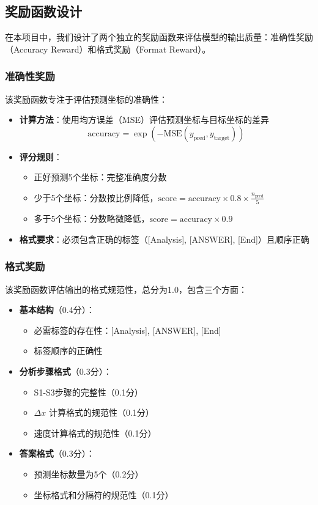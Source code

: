 \documentclass[a4paper, 12pt]{article}
\begin{document}
\subsection{奖励函数设计}
在本项目中，我们设计了两个独立的奖励函数来评估模型的输出质量：准确性奖励（Accuracy Reward）和格式奖励（Format Reward）。

\subsubsection{准确性奖励}
该奖励函数专注于评估预测坐标的准确性：
\begin{itemize}
    \item \textbf{计算方法}：使用均方误差（MSE）评估预测坐标与目标坐标的差异
        \begin{equation}
            \text{accuracy} = \exp(-\text{MSE}(y_{\text{pred}}, y_{\text{target}}))
        \end{equation}
    \item \textbf{评分规则}：
        \begin{itemize}
            \item 正好预测5个坐标：完整准确度分数
            \item 少于5个坐标：分数按比例降低，$\text{score} = \text{accuracy} \times 0.8 \times \frac{n_{\text{pred}}}{5}$
            \item 多于5个坐标：分数略微降低，$\text{score} = \text{accuracy} \times 0.9$
        \end{itemize}
    \item \textbf{格式要求}：必须包含正确的标签（[Analysis], [ANSWER], [End]）且顺序正确
\end{itemize}

\subsubsection{格式奖励}
该奖励函数评估输出的格式规范性，总分为1.0，包含三个方面：
\begin{itemize}
    \item \textbf{基本结构}（0.4分）：
        \begin{itemize}
            \item 必需标签的存在性：[Analysis], [ANSWER], [End]
            \item 标签顺序的正确性
        \end{itemize}
    \item \textbf{分析步骤格式}（0.3分）：
        \begin{itemize}
            \item S1-S3步骤的完整性（0.1分）
            \item $\Delta x$ 计算格式的规范性（0.1分）
            \item 速度计算格式的规范性（0.1分）
        \end{itemize}
    \item \textbf{答案格式}（0.3分）：
        \begin{itemize}
            \item 预测坐标数量为5个（0.2分）
            \item 坐标格式和分隔符的规范性（0.1分）
        \end{itemize}
\end{itemize}
\end{document}
